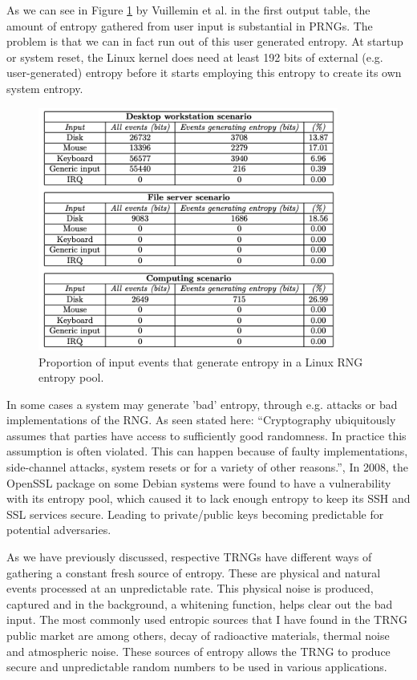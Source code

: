 \documentclass[]{final_report}
\begin{document}
\par{As we can see in Figure \ref{fig:TableA} by Vuillemin et al. \cite{Vuillemin:2012} in the first output table, the amount of entropy gathered from user input is substantial in PRNGs. The problem is that we can in fact run out of this user generated entropy. At startup or system reset, the Linux kernel does need at least 192 bits\cite{Mowery:2013} of external (e.g. user-generated) entropy before it starts employing this entropy to create its own system entropy.}

\begin{figure}[h!]
\begin{center}
\includegraphics[height=8cm]{TableA}
\caption{Proportion of input events that generate entropy\cite{Vuillemin:2012} in a Linux RNG entropy pool.}
\label{fig:TableA}
\end{center}
\end{figure}

\par{In some cases a system may generate 'bad' entropy, through e.g. attacks or bad implementations of the RNG. As seen stated here\cite{Bellare:2009}:  ``Cryptography ubiquitously assumes that parties have access to sufficiently good randomness. In practice this assumption is often violated. This can happen because of faulty implementations, side-channel attacks, system resets or for a variety of other reasons.'', In 2008, the OpenSSL\cite{Yilek:2009} package on some Debian systems were found to have a vulnerability with its entropy pool, which caused it to lack enough entropy to keep its SSH and SSL services secure. Leading to private/public keys becoming predictable for potential adversaries.}

\par{As we have previously discussed, respective TRNGs have different ways of gathering a constant fresh source of entropy. These are physical and natural events processed at an unpredictable rate. This physical noise is produced, captured and in the background, a whitening function, helps clear out the bad input. The most commonly used entropic sources that I have found in the TRNG public market are among others, decay of radioactive materials\cite{Rohe:2003}, thermal noise\cite{Rohe:2003} and atmospheric noise\cite{Jun:1999}. These sources of entropy allows the TRNG to produce secure and unpredictable random numbers to be used in various applications.}
\end{document}
